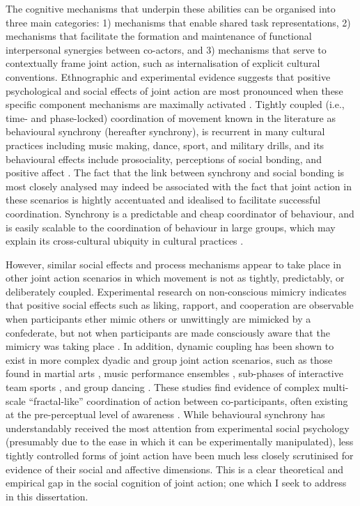 \begin{CJK}{UTF8}{gbsn}
The cognitive mechanisms that underpin these abilities can be organised into three main categories: 1) mechanisms that enable shared task representations, 2) mechanisms that facilitate the formation and maintenance of functional interpersonal synergies between co-actors, and 3) mechanisms that serve to contextually frame joint action, such as internalisation of explicit cultural conventions\citep{Sebanz2006,Vesper2017}.  Ethnographic and experimental evidence suggests that positive psychological and social effects of joint action are most pronounced when these specific component mechanisms are maximally activated \citep{Durkheim1965,McNeill1995,Mogan2017}.  Tightly coupled (i.e., time- and phase-locked) coordination of movement known in the literature as behavioural synchrony (hereafter synchrony), is recurrent in many cultural practices including music making, dance, sport, and military drills, and its behavioural effects include prosociality, perceptions of social bonding, and positive affect \citep{Mogan2017}.  The fact that the link between synchrony and social bonding is most closely analysed may indeed be associated with the fact that joint action in these scenarios is hightly accentuated and idealised to facilitate successful coordination.  Synchrony is a predictable and cheap coordinator of behaviour, and is easily scalable to the coordination of behaviour in large groups, which may explain its cross-cultural ubiquity in cultural practices \citep{Dunbar2010,Tarr2016}.

However, similar social effects and process mechanisms appear to take place in other joint action scenarios in which movement is not as tightly, predictably, or deliberately coupled.  Experimental research on non-conscious mimicry indicates that positive social effects such as liking, rapport, and cooperation are observable when participants ether mimic others or unwittingly are mimicked by a confederate, but not when participants are made consciously aware that the mimicry was taking place \citep{Bos2008,Lakin2008}.  In addition, dynamic coupling has been shown to exist in more complex dyadic and group joint action scenarios, such as those found in martial arts \citep{Schmidt2011}, music performance ensembles \citep{Demos2014}, sub-phases of interactive team sports \citep{Duarte2013}, and group dancing \citep{Chauvigne2017}. These studies find evidence of complex multi-scale ``fractal-like'' coordination of action between co-participants, often existing at the pre-perceptual level of awareness \citep{Schmidt2011,Riley2011,Fusaroli2013}. While behavioural synchrony has understandably received the most attention from experimental social psychology (presumably due to the ease in which it can be experimentally manipulated), less tightly controlled forms of joint action have been much less closely scrutinised for evidence of their social and affective dimensions\citep[but see]{Marsh2009,Miles2009}.  This is a clear theoretical and empirical gap in the social cognition of joint action; one which I seek to address in this dissertation.


\end{CJK}
